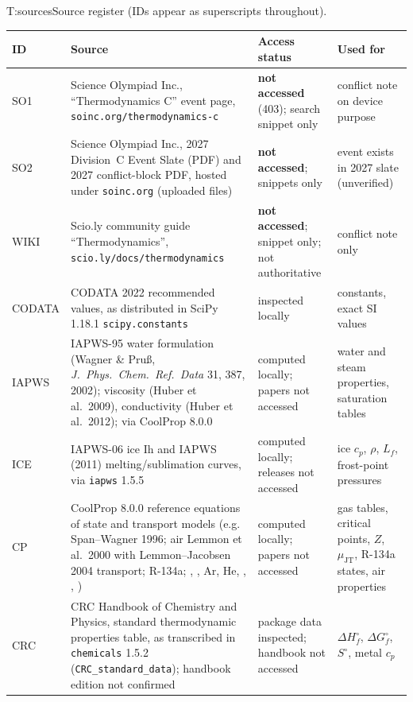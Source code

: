 \begin{reftab}{T:sources}{Source register (IDs appear as superscripts throughout).}
\small
\renewcommand{\arraystretch}{1.1}
\begin{tabularx}{\textwidth}{@{}lL{0.42\textwidth}L{0.17\textwidth}Y@{}}
\toprule
ID & Source & Access status & Used for\\
\midrule
{}SO1 & Science Olympiad Inc., ``Thermodynamics C'' event page, \texttt{soinc.org/thermodynamics-c} & \textbf{not accessed} (403); search snippet only & conflict note on device purpose\\
SO2 & Science Olympiad Inc., 2027 Division~C Event Slate (PDF) and 2027 conflict-block PDF, hosted under \texttt{soinc.org} (uploaded files) & \textbf{not accessed}; snippets only & event exists in 2027 slate (unverified)\\
WIKI & Scio.ly community guide ``Thermodynamics'', \texttt{scio.ly/docs/thermodynamics} & \textbf{not accessed}; snippet only; not authoritative & conflict note only\\
CODATA & CODATA 2022 recommended values, as distributed in SciPy 1.18.1 \texttt{scipy.constants} & inspected locally & constants, exact SI values\\
IAPWS & IAPWS-95 water formulation (Wagner \& Pru\ss, \emph{J.\ Phys.\ Chem.\ Ref.\ Data} 31, 387, 2002); viscosity (Huber et al.\ 2009), conductivity (Huber et al.\ 2012); via CoolProp 8.0.0 & computed locally; papers not accessed & water and steam properties, saturation tables\\
ICE & IAPWS-06 ice Ih and IAPWS (2011) melting/sublimation curves, via \texttt{iapws} 1.5.5 & computed locally; releases not accessed & ice $c_p$, $\rho$, $L_f$, frost-point pressures\\
CP & CoolProp 8.0.0 reference equations of state and transport models (e.g.\  Span--Wagner 1996; air Lemmon et al.\ 2000 with Lemmon--Jacobsen 2004 transport; R-134a; , , Ar, He, , , ) & computed locally; papers not accessed & gas tables, critical points, $Z$, $\mu_{\text{JT}}$, R-134a states, air properties\\
CRC & CRC Handbook of Chemistry and Physics, standard thermodynamic properties table, as transcribed in \texttt{chemicals} 1.5.2 (\texttt{CRC\_standard\_data}); handbook edition not confirmed & package data inspected; handbook not accessed & $\Delta H_f^\circ$, $\Delta G_f^\circ$, $S^\circ$, metal $c_p$\\

\end{tabularx}
\end{reftab}
